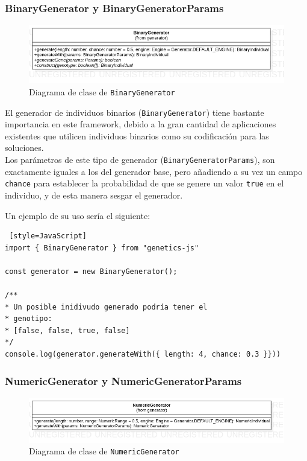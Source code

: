 \subsubsection{BinaryGenerator y BinaryGeneratorParams}

\begin{figure}[ht]
    \centering
    \includegraphics[scale=0.5]{mem/images/cap-4/4.2.3(Generador)/BinaryGenerator.png}
    \caption{Diagrama de clase de \texttt{BinaryGenerator}}
    \label{fig:generator-uml}
\end{figure}

El generador de individuos binarios (\texttt{BinaryGenerator}) tiene bastante importancia en este framework, debido a la gran cantidad de aplicaciones existentes que utilicen individuos binarios como su codificación para las soluciones. \\

Los parámetros de este tipo de generador (\texttt{BinaryGeneratorParams}), son exactamente iguales a los del generador base, pero añadiendo a su vez un campo \texttt{chance} para establecer la probabilidad de que se genere un valor \texttt{true} en el individuo, y de esta manera sesgar el generador.

Un ejemplo de su uso sería el siguiente: \\

\begin{lstlisting} [style=JavaScript]
import { BinaryGenerator } from "genetics-js"

const generator = new BinaryGenerator();

/**
* Un posible inidivudo generado podría tener el
* genotipo:
* [false, false, true, false]
*/
console.log(generator.generateWith({ length: 4, chance: 0.3 }}))
\end{lstlisting}


\subsubsection{NumericGenerator y NumericGeneratorParams}

\begin{figure}[H]
    \centering
    \includegraphics[scale=0.5]{mem/images/cap-4/4.2.3(Generador)/NumericGenerator.png}
    \caption{Diagrama de clase de \texttt{NumericGenerator}}
    \label{fig:generator-uml}
\end{figure}


